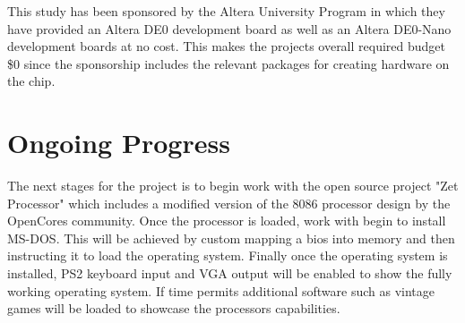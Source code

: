\documentclass[twoside]{article}
\begin{document}
This study has been sponsored by the Altera University Program in which they have provided an Altera DE0 development board as well as an Altera DE0-Nano development boards at no cost. This makes the projects overall required budget \$0 since the sponsorship includes the relevant packages for creating hardware on the chip.



\section{Ongoing Progress}

The next stages for the project is to begin work with the open source project "Zet Processor" which includes a modified version of the 8086 processor design by the OpenCores community. Once the processor is loaded, work with begin to install MS-DOS. This will be achieved by custom mapping a bios into memory and then instructing it to load the operating system. Finally once the operating system is installed, PS2 keyboard input and VGA output will be enabled to show the fully working operating system. If time permits additional software such as vintage games will be loaded to showcase the processors capabilities.

\newpage
\end{document}
